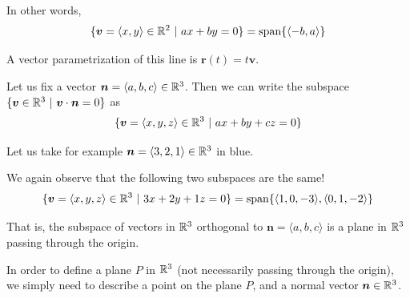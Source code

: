 In other words, 
$$\{\bm{v} = \langle x, y \rangle \in \mathbb{R}^2 \ | \ ax+by = 0\} = \textnormal{span}\{\langle -b, a \rangle\}$$

A vector parametrization of this line is $\bm{r}(t) = t\bm{v}$.



\begin{example}
    Let us fix a vector $\bm{n} = \langle a, b, c\rangle \in \mathbb{R}^3$.  Then we can write the subspace $\{\bm{v} \in \mathbb{R}^3 \ | \ \bm{v} \cdot \bm{n} = 0\}$ as
    $$\{\bm{v} = \langle x, y, z \rangle \in \mathbb{R}^3 \ | \ ax+by+cz = 0\}$$
    
    Let us take for example $\bm{n} = \langle 3, 2, 1\rangle \in \mathbb{R}^3$ in blue.
    
    
    \begin{center}
    \end{center}

    We again observe that the following two subspaces are the same!
    $$\{\bm{v} = \langle x, y, z\rangle \in \R^3 \ | \ 3x+2y+1z = 0\} = \textnormal{span}\{\langle 1, 0, -3 \rangle, \langle 0, 1, -2 \rangle\}$$
    
    That is, the subspace of vectors in $\mathbb{R}^3$ orthogonal to $\bm{n} = \langle a, b,c \rangle$ is a plane in $\mathbb{R}^3$ passing through the origin.
    
\end{example}
 
In order to define a plane $P$ in $\mathbb{R}^3$ (not necessarily passing through the origin), we simply need to describe a point on the plane $P$, and a normal vector $\bm{n} \in \mathbb{R}^3$.

